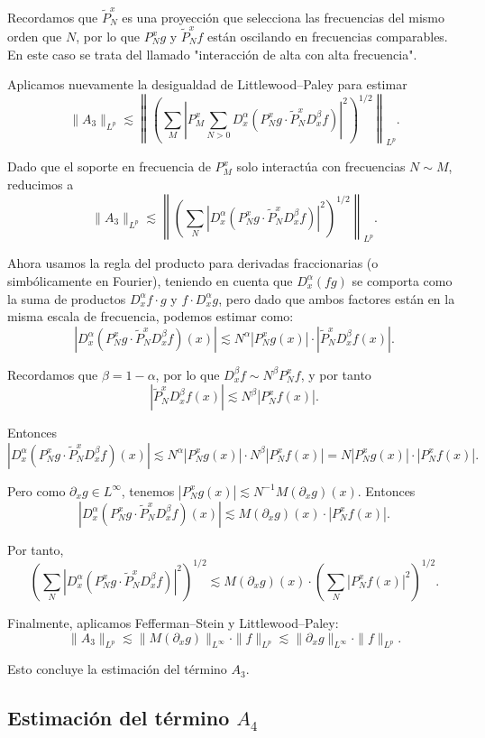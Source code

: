 \documentclass{aleph-revista}
\begin{document}
Recordamos que \( \widetilde{P}_N^x \) es una proyecci\'on que selecciona las frecuencias del mismo orden que $N$, por lo que $P_N^x g$ y $\widetilde{P}_N^x f$ est\'an oscilando en frecuencias comparables. En este caso se trata del llamado "interacci\'on de alta con alta frecuencia".

Aplicamos nuevamente la desigualdad de Littlewood--Paley para estimar
\[
\|A_3\|_{L^p} \lesssim \left\| \left( \sum_{M} |P_M^x \sum_{N > 0} D_x^\alpha (P_N^x g \cdot \widetilde{P}_N^x D_x^\beta f)|^2 \right)^{1/2} \right\|_{L^p}.
\]

Dado que el soporte en frecuencia de $P_M^x$ solo interact\'ua con frecuencias $N \sim M$, reducimos a
\[
\|A_3\|_{L^p} \lesssim \left\| \left( \sum_{N} |D_x^\alpha (P_N^x g \cdot \widetilde{P}_N^x D_x^\beta f)|^2 \right)^{1/2} \right\|_{L^p}.
\]

Ahora usamos la regla del producto para derivadas fraccionarias (o simb\'olicamente en Fourier), teniendo en cuenta que $D_x^\alpha (f g)$ se comporta como la suma de productos $D_x^\alpha f \cdot g$ y $f \cdot D_x^\alpha g$, pero dado que ambos factores est\'an en la misma escala de frecuencia, podemos estimar como:
\[
|D_x^\alpha (P_N^x g \cdot \widetilde{P}_N^x D_x^\beta f)(x)| \lesssim N^\alpha |P_N^x g(x)| \cdot |\widetilde{P}_N^x D_x^\beta f(x)|.
\]

Recordamos que $\beta = 1 - \alpha$, por lo que $D_x^\beta f \sim N^\beta P_N^x f$, y por tanto
\[
|\widetilde{P}_N^x D_x^\beta f(x)| \lesssim N^\beta |P_N^x f(x)|.
\]

Entonces
\[
|D_x^\alpha (P_N^x g \cdot \widetilde{P}_N^x D_x^\beta f)(x)| \lesssim N^\alpha |P_N^x g(x)| \cdot N^\beta |P_N^x f(x)| = N |P_N^x g(x)| \cdot |P_N^x f(x)|.
\]

Pero como $\partial_x g \in L^\infty$, tenemos $|P_N^x g(x)| \lesssim N^{-1} M(\partial_x g)(x)$. Entonces
\[
|D_x^\alpha (P_N^x g \cdot \widetilde{P}_N^x D_x^\beta f)(x)| \lesssim M(\partial_x g)(x) \cdot |P_N^x f(x)|.
\]

Por tanto,
\[
\left( \sum_{N} |D_x^\alpha (P_N^x g \cdot \widetilde{P}_N^x D_x^\beta f)|^2 \right)^{1/2} \lesssim M(\partial_x g)(x) \cdot \left( \sum_N |P_N^x f(x)|^2 \right)^{1/2}.
\]

Finalmente, aplicamos Fefferman--Stein y Littlewood--Paley:
\[
\|A_3\|_{L^p} \lesssim \|M(\partial_x g)\|_{L^\infty} \cdot \|f\|_{L^p} \lesssim \|\partial_x g\|_{L^\infty} \cdot \|f\|_{L^p}.
\]

Esto concluye la estimaci\'on del t\'ermino $A_3$.
\subsection*{Estimaci\'on del t\'ermino $A_4$}
\end{document}
